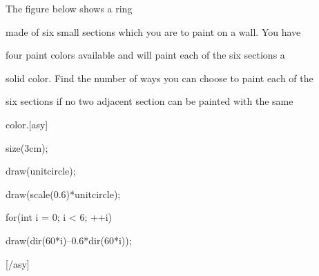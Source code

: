 The figure below shows a ring 

made of six small sections which you are to paint on a wall. You have 

four paint colors available and will paint each of the six sections a 

solid color. Find the number of ways you can choose to paint each of the

 six sections if no two adjacent section can be painted with the same 

color.[asy]

size(3cm);

draw(unitcircle);

draw(scale(0.6)*unitcircle);

for(int i = 0; i < 6; ++i){

	draw(dir(60*i)--0.6*dir(60*i));

}

[/asy]